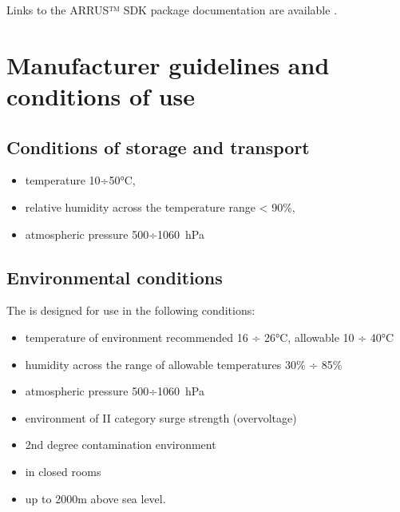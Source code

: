 \documentclass[letterpaper,10pt,english]{sphinxmanual}
\begin{document}
\sphinxAtStartPar
Links to the ARRUS™ SDK package documentation are available
.

\sphinxstepscope


\chapter{Manufacturer guidelines and conditions of use}
\label{\detokenize{content/manufacturer_guidelines:manufacturer-guidelines-and-conditions-of-use}}\label{\detokenize{content/manufacturer_guidelines::doc}}

\section{Conditions of storage and transport}
\label{\detokenize{content/manufacturer_guidelines:conditions-of-storage-and-transport}}\begin{itemize}
\item {} 
\sphinxAtStartPar
temperature \sphinxhyphen{}10÷50°C,

\item {} 
\sphinxAtStartPar
relative humidity across the temperature range \textless{} 90\%,

\item {} 
\sphinxAtStartPar
atmospheric pressure 500÷1060 hPa

\end{itemize}


\section{Environmental conditions}
\label{\detokenize{content/manufacturer_guidelines:environmental-conditions}}
\sphinxAtStartPar
The  is designed for use in the following conditions:
\begin{itemize}
\item {} 
\sphinxAtStartPar
temperature of environment recommended 16 ÷ 26°C, allowable 10 ÷
40°C

\item {} 
\sphinxAtStartPar
humidity across the range of allowable temperatures 30\% ÷ 85\%

\item {} 
\sphinxAtStartPar
atmospheric pressure 500÷1060 hPa

\item {} 
\sphinxAtStartPar
environment of II category surge strength (overvoltage)

\item {} 
\sphinxAtStartPar
2nd degree contamination environment

\item {} 
\sphinxAtStartPar
in closed rooms

\item {} 
\sphinxAtStartPar
up to 2000m above sea level.

\end{itemize}
\end{document}
